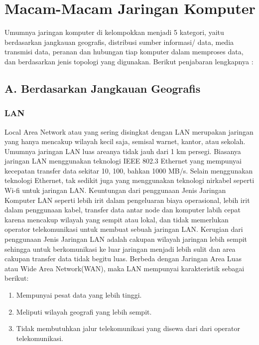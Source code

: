 \section{Macam-Macam Jaringan Komputer}
  Umumnya jaringan komputer di kelompokkan menjadi 5 kategori, yaitu berdasarkan jangkauan geografis, distribusi sumber informasi/ data, media transmisi data, peranan dan hubungan tiap komputer dalam memproses data, dan berdasarkan jenis topologi yang digunakan. Berikut penjabaran lengkapnya :
  \subsection{A. Berdasarkan Jangkauan Geografis}
    \subsubsection{LAN}
      Local Area Network atau yang sering disingkat dengan LAN merupakan jaringan yang hanya mencakup wilayah kecil saja, semisal warnet, kantor, atau sekolah. Umumnya jaringan LAN luas areanya tidak jauh dari 1 km persegi.
    Biasanya jaringan LAN menggunakan teknologi IEEE 802.3 Ethernet yang mempunyai kecepatan transfer data sekitar 10, 100, bahkan 1000 MB/s. Selain menggunakan teknologi Ethernet, tak sedikit juga yang menggunakan teknologi nirkabel seperti Wi-fi untuk jaringan LAN.
    Keuntungan dari penggunaan Jenis Jaringan Komputer LAN seperti lebih irit dalam pengeluaran biaya operasional, lebih irit dalam penggunaan kabel, transfer data antar node dan komputer labih cepat karena mencakup wilayah yang sempit atau lokal, dan tidak memerlukan operator telekomunikasi untuk membuat sebuah jaringan LAN.
    Kerugian dari penggunaan Jenis Jaringan LAN adalah cakupan wilayah jaringan lebih sempit sehingga untuk berkomunikasi ke luar jaringan menjadi lebih sulit dan area cakupan transfer data tidak begitu luas.
    Berbeda dengan Jaringan Area Luas atau Wide Area Network(WAN), maka LAN mempunyai karakteristik sebagai berikut:
    \begin{enumerate}
    \item Mempunyai pesat data yang lebih tinggi.
    \item Meliputi wilayah geografi yang lebih sempit.
    \item Tidak membutuhkan jalur telekomunikasi yang disewa dari dari operator telekomunikasi.
    \end{enumerate}
